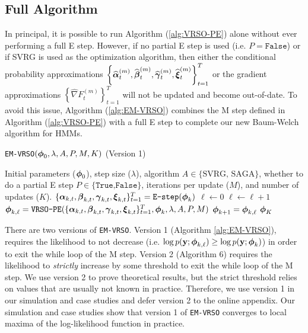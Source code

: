 \subsection{Full Algorithm}

In principal, it is possible to run Algorithm (\ref{alg:VRSO-PE}) alone without ever performing a full E step. However, if no partial E step is used (i.e. $P = \texttt{False}$) or if SVRG is used as the optimization algorithm, then either the conditional probability approximations $\left\{\widehat {\boldsymbol{\alpha}}_t^{(m)}, \widehat {\boldsymbol{\beta}}_t^{(m)}, \widehat {\boldsymbol{\gamma}}_t^{(m)}, \widehat {\boldsymbol{\xi}}_t^{(m)} \right\}_{t=1}^T$ or the gradient approximations $\left\{\widehat \nabla F_{t}^{(m)} \right\}_{t=1}^T$ will not be updated and become out-of-date. To avoid this issue, Algorithm (\ref{alg:EM-VRSO}) combines the M step defined in Algorithm (\ref{alg:VRSO-PE}) with a full E step to complete our new Baum-Welch algorithm for HMMs.

\begin{algorithm}
\caption{\texttt{EM-VRSO}$(\boldsymbol{\phi}_0,\lambda, A, P, M, K)$ (Version 1)}\label{alg:EM-VRSO}
\begin{algorithmic}[1]
\Require Initial parameters ($\boldsymbol{\phi}_{0}$), step size ($\lambda$), algorithm $A \in \{\text{SVRG, SAGA}\}$, whether to do a partial E step $P \in \{\texttt{True,False}\}$, iterations per update ($M$), and number of updates ($K$).
%
% 
\State $\{\boldsymbol{\alpha}_{k,t}, \boldsymbol{\beta}_{k,t}, \boldsymbol{\gamma}_{k,t}, \boldsymbol{\xi}_{k,t}\}_{t=1}^T = \texttt{E-step}(\boldsymbol{\phi}_{k})$ 
%
%
\State $\ell \gets 0$ 
%
%
\State $\ell \gets \ell+1$
\State $\boldsymbol{\phi}_{k,\ell} = \texttt{VRSO-PE}(\{\boldsymbol{\alpha}_{k,t}, \boldsymbol{\beta}_{k,t}, \boldsymbol{\gamma}_{k,t}, \boldsymbol{\xi}_{k,t}\}_{t=1}^T,\boldsymbol{\phi}_k,\lambda,A,P,M)$
%
\EndWhile
\State $\boldsymbol{\phi}_{k+1} = \boldsymbol{\phi}_{k,\ell}$
\EndFor
\State \Return $\boldsymbol{\phi}_K$
\end{algorithmic}
\end{algorithm}

There are two versions of \texttt{EM-VRSO}. Version 1 (Algorithm \ref{alg:EM-VRSO}), requires the likelihood to not decrease (i.e. $\log p(\mathbf{y};\boldsymbol{\phi}_{k,\ell}) \geq \log p(\mathbf{y};\boldsymbol{\phi}_{k})$) in order to exit the while loop of the M step. Version 2 (Algorithm 6) requires the likelihood to \textit{strictly} increase by some threshold to exit the while loop of the M step. We use version 2 to prove theoretical results, but the strict threshold relies on values that are usually not known in practice. Therefore, we use version 1 in our simulation and case studies and defer version 2 to the online appendix. Our simulation and case studies show that version 1 of \texttt{EM-VRSO} converges to local maxima of the log-likelihood function in practice. 

